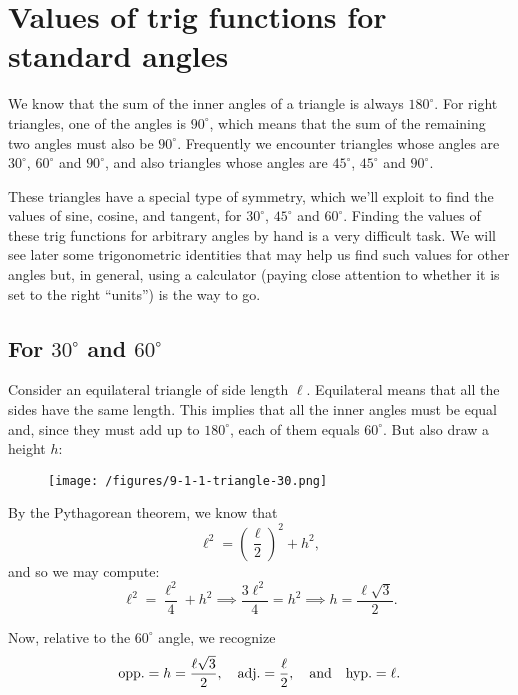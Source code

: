 \documentclass{ximera}
\begin{document}
\begin{example}
\begin{enumerate}[label=\alph*.]
  \end{enumerate}
\end{example}


\section{Values of trig functions for standard angles}

We know that the sum of the inner angles of a triangle is always $180^\circ$. For right triangles, one of the angles is $90^\circ$, which means that the sum of the remaining two angles must also be $90^\circ$. Frequently we encounter triangles whose angles are $30^\circ$, $60^\circ$ and $90^\circ$, and also triangles whose angles are $45^\circ$, $45^\circ$ and $90^\circ$.

These triangles have a special type of symmetry, which we'll exploit to find the values of sine, cosine, and tangent, for $30^\circ$, $45^\circ$ and $60^\circ$. Finding the values of these trig functions for arbitrary angles by hand is a very difficult task. We will see later some trigonometric identities that may help us find such values for other angles but, in general, using a calculator (paying close attention to whether it is set to the right ``units'') is the way to go.

\subsection{For $30^\circ$ and $60^\circ$}

Consider an equilateral triangle of side length $\ell$. Equilateral means that all the sides have the same length. This implies that all the inner angles must be equal and, since they must add up to $180^\circ$, each of them equals $60^\circ$. But also draw a height $h$:

\begin{figure}[h]
  \centering
  \texttt{[image: /figures/9-1-1-triangle-30.png]}
\end{figure}

By the Pythagorean theorem, we know that $$\ell^2 = \left(\frac{\ell}{2}\right)^2 + h^2,$$and so we may compute: $$\ell^2 = \frac{\ell^2}{4} + h^2 \implies \frac{3\ell^2}{4} = h^2 \implies h = \frac{\ell\sqrt{3}}{2}.$$

Now, relative to the $60^\circ$ angle, we recognize $${\rm opp.} = h = \frac{\ell\sqrt{3}}{2}, \quad {\rm adj.} = \frac{\ell}{2}, \quad\mbox{and}\quad {\rm hyp.} = \ell.$$
\end{document}
